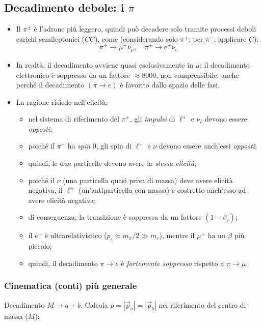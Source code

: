\subsection{Decadimento debole: i \texorpdfstring{$\pi$}{π}}
\begin{itemize}
    \item Il \(\pi^\pm\) è l'adrone più leggero, quindi può decadere solo tramite processi deboli carichi semileptonici (\(CC\)), come (considerando solo \(\pi^+\); per \(\pi^-\), applicare \(C\)):  
    \[
    \pi^+ \to \mu^+ \nu_\mu, \quad \pi^+ \to e^+ \nu_e
    \]
    \item In realtà, il decadimento avviene quasi esclusivamente in \(\mu\): il decadimento elettronico è soppresso da un fattore \(\approx 8000\), non comprensibile, anche perché il decadimento \((\pi \to e)\) è favorito dallo spazio delle fasi.  
    \item La ragione risiede nell'elicità:
    \begin{itemize}
        \item nel sistema di riferimento del \(\pi^+\), gli \textit{impulsi} di \(\ell^+\) e \(\nu_\ell\) devono essere \textit{opposti};
        \item poiché il \(\pi^+\) ha \textit{spin} \(0\), gli spin di \(\ell^+\) e \(\nu\) devono essere anch'essi \textit{opposti};
        \item quindi, le due particelle devono avere la \textit{stessa elicità};
        \item poiché il \(\nu\) (una particella quasi priva di massa) deve avere elicità negativa, il \(\ell^+\) (un'antiparticella con massa) è costretto anch'esso ad avere elicità negativa;
        \item di conseguenza, la transizione è soppressa da un fattore \((1 - \beta_\ell)\);
        \item il \(e^+\) è ultrarelativistico (\(p_e \approx m_\pi / 2 \gg m_e\)), mentre il \(\mu^+\) ha un \(\beta\) più piccolo;
        \item quindi, il decadimento \(\pi \to e\) è \textit{fortemente soppresso} rispetto a \(\pi \to \mu\).
    \end{itemize}
\end{itemize}
\subsubsection{Cinematica (conti) più generale}
Decadimento \( M \to a + b \). Calcola \( p = |\vec{p}_a| = |\vec{p}_b| \) nel riferimento del centro di massa ($M$):  


